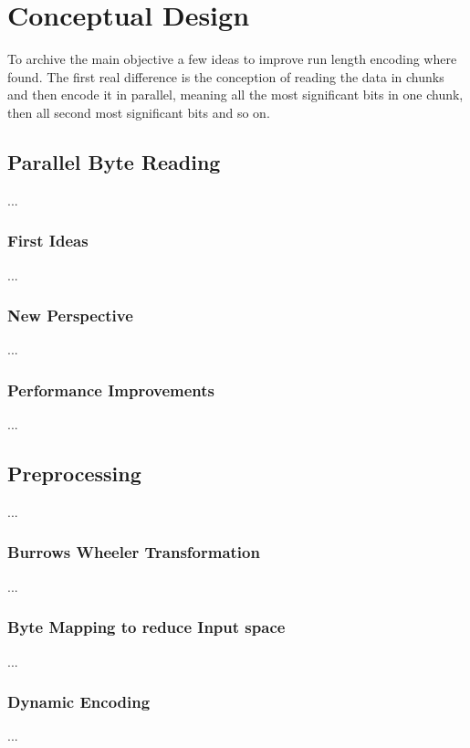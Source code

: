 
\chapter{Conceptual Design}
\label{ch:Conceptual Design}
\par{
To archive the main objective a few ideas to improve run length encoding where found. The first real difference is the conception of reading the data in chunks and then encode it in parallel, meaning all the most significant bits in one chunk, then all second most significant bits and so on.}

\section{Parallel Byte Reading}
\label{ch:Conceptual Design:sec:Parallel Byte Reading}
...
\subsection{First Ideas}
...
\subsection{New Perspective}
...
\subsection{Performance Improvements}
...
\section{Preprocessing}
\label{ch:Conceptual Design:sec:Preprocessing}
...

\subsection{Burrows Wheeler Transformation}
...
\subsection{Byte Mapping to reduce Input space}
...
\subsection{Dynamic Encoding}
...

